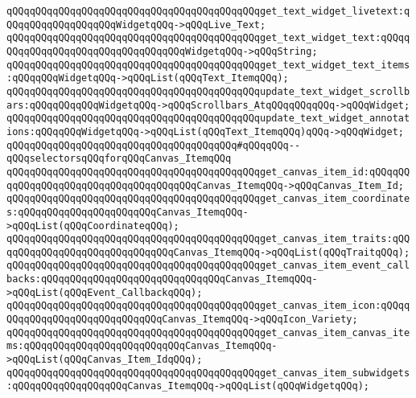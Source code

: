 \verb|qQQqqQQqqQQqqQQqqQQqqQQqqQQqqQQqqQQqqQQqqQQqget_text_widget_livetext:qQQqqQQqqQQqqQQqqQQqWidgetqQQq->qQQqLive_Text;|\newline
\verb|qQQqqQQqqQQqqQQqqQQqqQQqqQQqqQQqqQQqqQQqqQQqget_text_widget_text:qQQqqQQqqQQqqQQqqQQqqQQqqQQqqQQqqQQqWidgetqQQq->qQQqString;|\newline
\verb|qQQqqQQqqQQqqQQqqQQqqQQqqQQqqQQqqQQqqQQqqQQqget_text_widget_text_items:qQQqqQQqWidgetqQQq->qQQqList(qQQqText_ItemqQQq);|\newline
\verb|qQQqqQQqqQQqqQQqqQQqqQQqqQQqqQQqqQQqqQQqqQQqupdate_text_widget_scrollbars:qQQqqQQqqQQqWidgetqQQq->qQQqScrollbars_AtqQQqqQQqqQQq->qQQqWidget;|\newline
\verb|qQQqqQQqqQQqqQQqqQQqqQQqqQQqqQQqqQQqqQQqqQQqupdate_text_widget_annotations:qQQqqQQqWidgetqQQq->qQQqList(qQQqText_ItemqQQq)qQQq->qQQqWidget;|\newline
\newline
\newline
\verb|qQQqqQQqqQQqqQQqqQQqqQQqqQQqqQQqqQQqqQQq#qQQqqQQq--qQQqselectorsqQQqforqQQqCanvas_ItemqQQq|\newline
\verb|qQQqqQQqqQQqqQQqqQQqqQQqqQQqqQQqqQQqqQQqqQQqget_canvas_item_id:qQQqqQQqqQQqqQQqqQQqqQQqqQQqqQQqqQQqqQQqCanvas_ItemqQQq->qQQqCanvas_Item_Id;|\newline
\verb|qQQqqQQqqQQqqQQqqQQqqQQqqQQqqQQqqQQqqQQqqQQqget_canvas_item_coordinates:qQQqqQQqqQQqqQQqqQQqqQQqCanvas_ItemqQQq->qQQqList(qQQqCoordinateqQQq);|\newline
\verb|qQQqqQQqqQQqqQQqqQQqqQQqqQQqqQQqqQQqqQQqqQQqget_canvas_item_traits:qQQqqQQqqQQqqQQqqQQqqQQqqQQqqQQqCanvas_ItemqQQq->qQQqList(qQQqTraitqQQq);|\newline
\verb|qQQqqQQqqQQqqQQqqQQqqQQqqQQqqQQqqQQqqQQqqQQqget_canvas_item_event_callbacks:qQQqqQQqqQQqqQQqqQQqqQQqqQQqqQQqCanvas_ItemqQQq->qQQqList(qQQqEvent_CallbackqQQq);|\newline
\newline
\verb|qQQqqQQqqQQqqQQqqQQqqQQqqQQqqQQqqQQqqQQqqQQqget_canvas_item_icon:qQQqqQQqqQQqqQQqqQQqqQQqqQQqqQQqCanvas_ItemqQQq->qQQqIcon_Variety;|\newline
\verb|qQQqqQQqqQQqqQQqqQQqqQQqqQQqqQQqqQQqqQQqqQQqget_canvas_item_canvas_items:qQQqqQQqqQQqqQQqqQQqqQQqqQQqCanvas_ItemqQQq->qQQqList(qQQqCanvas_Item_IdqQQq);|\newline
\verb|qQQqqQQqqQQqqQQqqQQqqQQqqQQqqQQqqQQqqQQqqQQqget_canvas_item_subwidgets:qQQqqQQqqQQqqQQqqQQqCanvas_ItemqQQq->qQQqList(qQQqWidgetqQQq);|\newline
\newline
